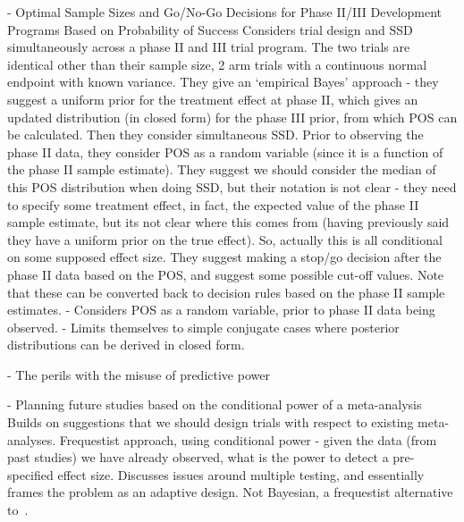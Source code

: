 \documentclass{article} %
\begin{document}
\cite{Jiang2011} - Optimal Sample Sizes and Go/No-Go Decisions for Phase {II}/{III} Development Programs Based on Probability of Success
Considers trial design and SSD simultaneously across a phase II and III trial program. The two trials are identical other than their sample size, 2 arm trials with a continuous normal endpoint with known variance. They give an `empirical Bayes' approach - they suggest a uniform prior for the treatment effect at phase II, which gives an updated distribution (in closed form) for the phase III prior, from which POS can be calculated. Then they consider simultaneous SSD. Prior to observing the phase II data, they consider POS as a random variable (since it is a function of the phase II sample estimate). They suggest we should consider the median of this POS distribution when doing SSD, but their notation is not clear - they need to specify some treatment effect, in fact, the expected value of the phase II sample estimate, but its not clear where this comes from (having previously said they have a uniform prior on the true effect). So, actually this is all conditional on some supposed effect size. They suggest making a stop/go decision after the phase II data based on the POS, and suggest some possible cut-off values. Note that these can be converted back to decision rules based on the phase II sample estimates.
- Considers POS as a random variable, prior to phase II data being observed.
- Limits themselves to simple conjugate cases where posterior distributions can be derived in closed form.

\cite{Dallow2011} - The perils with the misuse of predictive power

\cite{Roloff2012} - Planning future studies based on the conditional power of a meta-analysis
Builds on suggestions that we should design trials with respect to existing meta-analyses. Frequestist approach, using conditional power - given the data (from past studies) we have already observed, what is the power to detect a pre-specified effect size. Discusses issues around multiple testing, and essentially frames the problem as an adaptive design. Not Bayesian, a frequestist alternative to~\cite{Sutton2007}.
\end{document}
